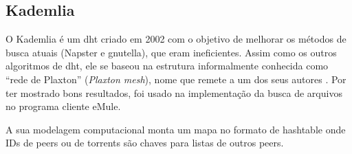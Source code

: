 
\subsection*{Kademlia}

O Kademlia é um \gls*{dht} criado em 2002 \cite{artigo:kademlia} com o objetivo de
melhorar os métodos de busca atuais (Napster e \gls*{gnutella}), que eram ineficientes.
Assim como os outros algoritmos de \gls*{dht}, ele se baseou na estrutura informalmente
conhecida como \enquote{rede de Plaxton} (\emph{Plaxton mesh}), nome que remete a um
dos seus autores \cite{artigo:dht}. Por ter mostrado bons resultados, foi usado na
implementação da busca de arquivos no programa cliente eMule.

A sua modelagem computacional monta um mapa no formato de \gls*{hashtable} onde IDs de
\glspl*{peer} ou de \glspl*{torrent} são chaves para listas de outros \glspl*{peer}.







